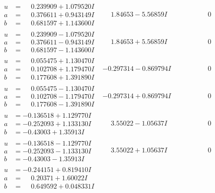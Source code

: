 \documentclass[1p]{elsarticle_modified}
\theoremstyle{definition}
\begin{document}
$$\begin{array}{c|c|c}
\begin{aligned}
u &= \phantom{-}0.239909 + 1.079520 I \\
a &= \phantom{-}0.376611 + 0.943149 I \\
b &= \phantom{-}0.681597 + 1.143600 I\end{aligned}
 & \phantom{-}1.84653 - 5.56859 I & \phantom{-0.000000 } 0 \\ \hline\begin{aligned}
u &= \phantom{-}0.239909 - 1.079520 I \\
a &= \phantom{-}0.376611 - 0.943149 I \\
b &= \phantom{-}0.681597 - 1.143600 I\end{aligned}
 & \phantom{-}1.84653 + 5.56859 I & \phantom{-0.000000 } 0 \\ \hline\begin{aligned}
u &= \phantom{-}0.055475 + 1.130470 I \\
a &= \phantom{-}0.102708 + 1.179470 I \\
b &= \phantom{-}0.177608 + 1.391890 I\end{aligned}
 & -0.297314 - 0.869794 I & \phantom{-0.000000 } 0 \\ \hline\begin{aligned}
u &= \phantom{-}0.055475 - 1.130470 I \\
a &= \phantom{-}0.102708 - 1.179470 I \\
b &= \phantom{-}0.177608 - 1.391890 I\end{aligned}
 & -0.297314 + 0.869794 I & \phantom{-0.000000 } 0 \\ \hline\begin{aligned}
u &= -0.136518 + 1.129770 I \\
a &= -0.252093 + 1.133130 I \\
b &= -0.43003 + 1.35913 I\end{aligned}
 & \phantom{-}3.55022 - 1.05637 I & \phantom{-0.000000 } 0 \\ \hline\begin{aligned}
u &= -0.136518 - 1.129770 I \\
a &= -0.252093 - 1.133130 I \\
b &= -0.43003 - 1.35913 I\end{aligned}
 & \phantom{-}3.55022 + 1.05637 I & \phantom{-0.000000 } 0 \\ \hline\begin{aligned}
u &= -0.244151 + 0.819410 I \\
a &= \phantom{-}0.20371 + 1.60022 I \\
b &= \phantom{-}0.649592 + 0.048331 I\end{aligned}

\end{array}$$
\end{document}
